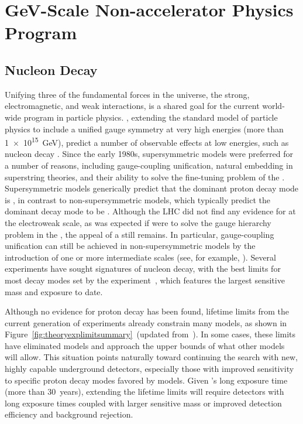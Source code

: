 \chapter{GeV-Scale Non-accelerator Physics Program}
\label{ch:nonaccel}


\section{Nucleon Decay}
\label{sec:nonaccel-ndk}

Unifying three of the fundamental forces in the universe, the strong, 
electromagnetic, and weak interactions, is a shared goal for the current 
world-wide program in particle physics. , extending the standard model of particle physics to include a unified gauge symmetry 
at very high energies  (more than \SI{1e15}{\GeV}), predict a number of observable 
effects at low energies, such as nucleon  decay \cite{Pati:1973rp,Georgi:1974sy,Dimopoulos:1981dw,Langacker:1980js,deBoer:1994dg,Nath:2006ut}. 
Since the early 1980s, supersymmetric  models were preferred for a number of reasons, including gauge-coupling unification, natural embedding in superstring theories, and their ability to solve the fine-tuning problem of the .  Supersymmetric  models generically predict that the dominant proton decay mode is \ptoknubar, in contrast to non-supersymmetric  models, which typically predict
the dominant decay mode to be \ptoepizero.  Although the LHC did not find any evidence for  at the electroweak scale, as was expected if  were to solve the gauge hierarchy problem in the , the appeal of a  still remains. In particular, gauge-coupling unification can still be achieved in non-supersymmetric  models by the introduction of one or more intermediate scales (see, for example, \cite{Altarelli:2013aqa}).
Several experiments have sought signatures of nucleon decay, with the best limits for most decay modes set by the \superk experiment~\cite{Abe:2014mwa,Miura:2016krn,TheSuper-Kamiokande:2017tit}, 
which features the largest sensitive mass and exposure to date. 

Although no evidence for proton decay has been found, lifetime limits from the current generation of experiments already constrain many  models, as shown in Figure~\ref{fig:theoryexplimitsummary}~(updated from~\cite{Babu:2013jba}). In some cases, these limits have eliminated models and approach the upper bounds of what other models will allow. This situation points naturally toward continuing the search with new, highly capable underground detectors, especially those with improved sensitivity to specific proton decay modes favored by  models. Given \superk's long exposure time (more than \SI{30}{years}), extending the lifetime limits will require detectors with long exposure times coupled with larger sensitive mass or improved detection efficiency and background rejection.  

